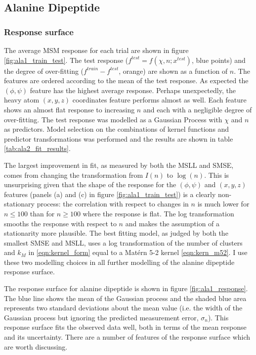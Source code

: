 \subsection{Alanine Dipeptide}\label{subsec:ala1}
\subsubsection{Response surface}\label{subsubsec:ala_rsm}
The average MSM response for each trial are shown in figure \ref{fig:ala1_train_test}. The test response ($f^{test} = f(\chi, n; x^{test})$, blue points) and the degree of over-fitting ($f^{train} - f^{test}$, orange) are shown as a function of $n$. The  features are ordered according to the  mean of the test response. As expected the  $(\phi, \psi)$ feature has the highest average response. Perhaps unexpectedly, the heavy atom $(x,y,z)$ coordinates feature performs almost as well. Each feature shows an almost flat response to increasing $n$ and each with a negligible degree of over-fitting. 
The test response was modelled as a Gaussian Process with $\chi$ and $n$ as predictors. Model selection on the combinations of kernel functions and predictor transformations was performed and the results are shown in table \ref{tab:ala2_fit_results}.  

The largest improvement in fit, as measured by both the MSLL and SMSE, comes from changing the transformation from $I(n)$ to $\log{(n)}$. This is unsurprising given that the shape of the response for the $(\phi, \psi)$ and $(x,y,z)$ features (panels (a) and (c) in figure \ref{fig:ala1_train_test}) is a clearly non-stationary process: the correlation with respect to changes in $n$ is much lower for $n\leq 100$ than for $n\geq 100$ where the response is flat. The log transformation smooths the response with respect to $n$ and makes the assumption of a stationarity more plausible. The best fitting model, as judged by both the smallest SMSE and MSLL, uses a log transformation of the number of clusters and $k_{M}$ in \ref{eqn:kernel_form} equal to a Mat{\'e}rn 5-2 kernel \ref{eqn:kern_m52}. I use these two modelling choices in all further modelling of the alanine dipeptide response surface.  

The response surface for alanine dipeptide is shown in figure \ref{fig:ala1_response}.  The blue line shows the mean of the Gaussian process and the shaded blue area represents two standard deviations about the mean value (i.e. the width of the Gaussian process but ignoring the predicted measurement error, $\sigma_n$). This response surface fits the observed data well, both in terms of the mean response and its uncertainty. There are a number of features of the response surface which are worth discussing. 

